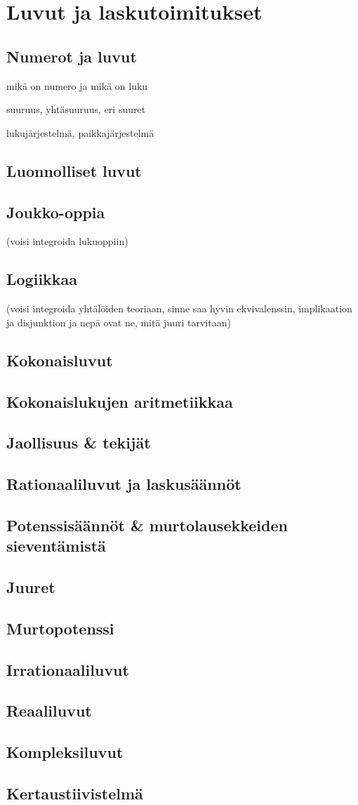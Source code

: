 


\part{Luvut ja laskutoimitukset}
\chapter{Numerot ja luvut}

mikä on numero ja mikä on luku

suuruus, yhtäsuuruus, eri suuret

lukujärjestelmä, paikkajärjestelmä



\chapter{Luonnolliset luvut}

\chapter{Joukko-oppia}

(voisi integroida lukuoppiin)
\chapter{Logiikkaa}

(voisi integroida yhtälöiden teoriaan, sinne saa hyvin ekvivalenssin, implikaation ja disjunktion ja nepä ovat ne, mitä juuri tarvitaan)
\chapter{Kokonaisluvut}
\chapter{Kokonaislukujen aritmetiikkaa}
\chapter{Jaollisuus \& tekijät}
\chapter{Rationaaliluvut ja laskusäännöt}
\chapter{Potenssisäännöt \& murtolausekkeiden sieventämistä}
\chapter{Juuret}
\chapter{Murtopotenssi}
\chapter{Irrationaaliluvut}
\chapter{Reaaliluvut}
\chapter{Kompleksiluvut}
\chapter{Kertaustiivistelmä}

